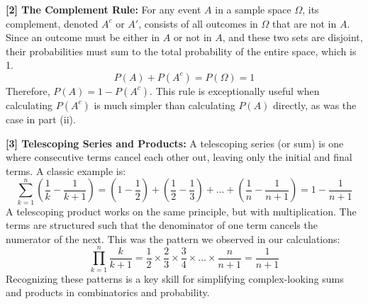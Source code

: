 \documentclass[11pt,a4paper]{article}
\begin{document}
\vspace{1cm}
\label{note2}
\hypertarget{note2}{\textbf{[2] The Complement Rule:}}
For any event $A$ in a sample space $\Omega$, its complement, denoted $A^c$ or $A'$, consists of all outcomes in $\Omega$ that are not in $A$. Since an outcome must be either in $A$ or not in $A$, and these two sets are disjoint, their probabilities must sum to the total probability of the entire space, which is 1.
$$ P(A) + P(A^c) = P(\Omega) = 1 $$
Therefore, $P(A) = 1 - P(A^c)$. This rule is exceptionally useful when calculating $P(A^c)$ is much simpler than calculating $P(A)$ directly, as was the case in part (ii).

\vspace{1cm}
\label{note3}
\hypertarget{note3}{\textbf{[3] Telescoping Series and Products:}}
A telescoping series (or sum) is one where consecutive terms cancel each other out, leaving only the initial and final terms. A classic example is:
$$ \sum_{k=1}^{n} \left(\frac{1}{k} - \frac{1}{k+1}\right) = \left(1 - \frac{1}{2}\right) + \left(\frac{1}{2} - \frac{1}{3}\right) + \dots + \left(\frac{1}{n} - \frac{1}{n+1}\right) = 1 - \frac{1}{n+1} $$
A telescoping product works on the same principle, but with multiplication. The terms are structured such that the denominator of one term cancels the numerator of the next. This was the pattern we observed in our calculations:
$$ \prod_{k=1}^{n} \frac{k}{k+1} = \frac{1}{2} \times \frac{2}{3} \times \frac{3}{4} \times \dots \times \frac{n}{n+1} = \frac{1}{n+1} $$
Recognizing these patterns is a key skill for simplifying complex-looking sums and products in combinatorics and probability.
\end{document}
